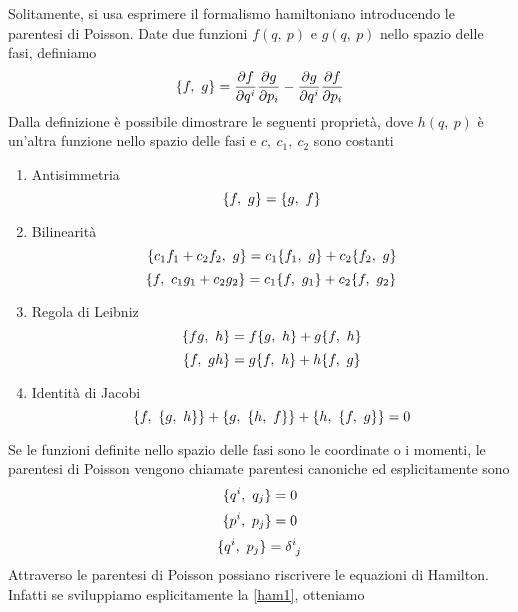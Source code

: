 \hfill 

    Solitamente, si usa esprimere il formalismo hamiltoniano introducendo le parentesi di Poisson. Date due funzioni $f(q, ~p)$ e $g(q, ~p)$ nello spazio delle fasi, definiamo 
\begin{equation}
    \{f, ~g\} = \frac{\partial f}{\partial q^i} \frac{\partial g}{\partial p_i} - \frac{\partial g}{\partial q^i} \frac{\partial f}{\partial p_i}
\end{equation}
    Dalla definizione è possibile dimostrare le seguenti proprietà, dove $h(q, ~p)$ è un'altra funzione nello spazio delle fasi e $c, ~c_1, ~c_2$ sono costanti
\begin{enumerate}
    \item Antisimmetria
\begin{equation}
    \{f, ~g\} = \{g, ~f\}
\end{equation}
    \item Bilinearità
\begin{equation}
    \{c_1f_1+c_2f_2, ~g\} = c_1 \{f_1, ~g\} + c_2 \{f_2, ~g\}
\end{equation}
\begin{equation}
    \{f, ~c_1g_1+c_2g_2\} = c_1 \{f, ~g_1\} + c_2 \{f, ~g_2\}
\end{equation}
    \item Regola di Leibniz
\begin{equation}
    \{fg, ~h\} = f \{g, ~h\} + g \{f, ~h\}
\end{equation}
\begin{equation}
    \{f, ~gh\} = g \{f, ~h\} + h \{f, ~g\}
\end{equation}
    \item Identità di Jacobi
\begin{equation}
    \{f, ~\{g, ~h\}\} + \{g, ~\{h, ~f\}\} + \{h, ~\{f, ~g\}\} = 0
\end{equation}
\end{enumerate}
    Se le funzioni definite nello spazio delle fasi sono le coordinate o i momenti, le parentesi di Poisson vengono chiamate parentesi canoniche ed esplicitamente sono 
\begin{equation} \label{canq}
    \{q^i, ~q_j\} = 0
\end{equation}
\begin{equation} \label{canp}
    \{p^i, ~p_j\} = 0
\end{equation}
\begin{equation} \label{canqq}
    \poi{q^i}{p_j} = \delta^i_{\phantom i j}
\end{equation}
    Attraverso le parentesi di Poisson possiano riscrivere le equazioni di Hamilton. Infatti se sviluppiamo esplicitamente la \eqref{ham1}, otteniamo 
